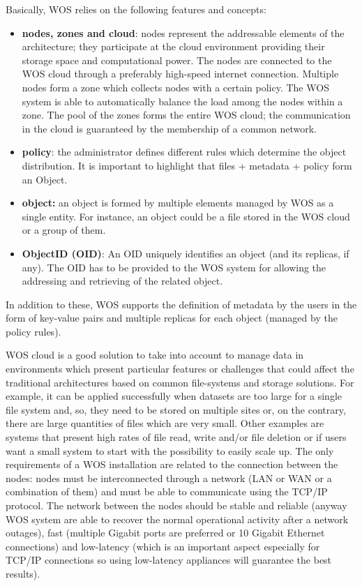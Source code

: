 Basically, WOS relies on the following features and concepts:
\begin{itemize}
\item \textbf{nodes, zones and cloud}: nodes represent the addressable elements of the architecture; they participate at the cloud environment providing their storage space and computational power.
The nodes are connected to the WOS cloud through a preferably high-speed internet connection.
Multiple nodes form a zone which collects nodes with a certain policy. The WOS system is able to automatically balance the load among the nodes within a zone.
The pool of the zones forms the entire WOS cloud; the communication in the cloud is guaranteed by the membership of a common network.
\item \textbf{policy}: the administrator defines different rules which determine the object distribution. It is important to highlight that files + metadata + policy form an Object.
\item \textbf{object:} an object is formed by multiple elements managed by WOS as a single entity. For instance, an object could be a file stored in the WOS cloud or a group of them.
\item \textbf{ObjectID (OID)}: An OID uniquely identifies an object (and its replicas, if any). The OID has to be provided to the WOS system for allowing the addressing and retrieving of the related object.
\end{itemize}
In addition to these, WOS supports the definition of metadata by the users in the form of key-value pairs and multiple replicas for each object (managed by the policy rules).

WOS cloud is a good solution to take into account to manage data in environments which present particular features or challenges that could affect the traditional architectures based on common file-systems and storage solutions.
For example, it can be applied successfully when datasets are too large for a single file system and, so, they need to be stored on multiple sites or, on the contrary, there are large quantities of files which are very small.
Other examples are systems that present high rates of file read, write and/or file deletion or if users want a small system to start with the possibility to easily scale up.
The only requirements of a WOS installation are related to the connection between the nodes: nodes must be interconnected through a network (LAN or WAN or a combination of them) and must be able to communicate using the TCP/IP protocol.
The network between the nodes should be stable and reliable (anyway WOS system are able to recover the normal operational activity after a network outages), fast (multiple Gigabit ports are preferred or 10 Gigabit Ethernet connections) and low-latency (which is an important aspect especially for TCP/IP connections so using low-latency appliances will guarantee the best results).


